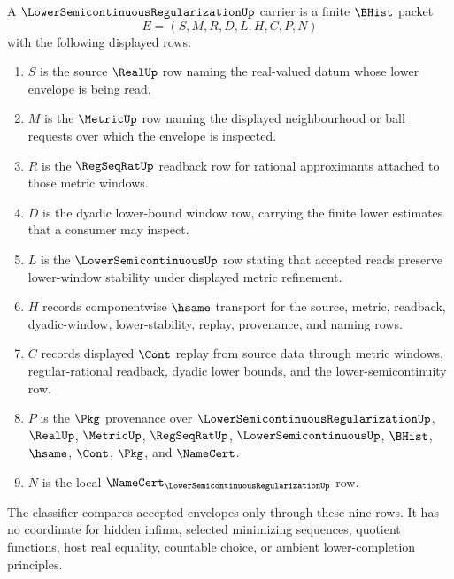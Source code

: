 \begin{definition}
\label{def:semicontinuous-envelope-carrier}
A $\LowerSemicontinuousRegularizationUp$ carrier is a finite $\BHist$ packet
$$
E=(S,M,R,D,L,H,C,P,N)
$$
with the following displayed rows:
\begin{enumerate}
\item $S$ is the source $\RealUp$ row naming the real-valued datum whose lower envelope is being read.
\item $M$ is the $\MetricUp$ row naming the displayed neighbourhood or ball requests over which the envelope is inspected.
\item $R$ is the $\RegSeqRatUp$ readback row for rational approximants attached to those metric windows.
\item $D$ is the dyadic lower-bound window row, carrying the finite lower estimates that a consumer may inspect.
\item $L$ is the $\LowerSemicontinuousUp$ row stating that accepted reads preserve lower-window stability under displayed metric refinement.
\item $H$ records componentwise $\hsame$ transport for the source, metric, readback, dyadic-window, lower-stability, replay, provenance, and naming rows.
\item $C$ records displayed $\Cont$ replay from source data through metric windows, regular-rational readback, dyadic lower bounds, and the lower-semicontinuity row.
\item $P$ is the $\Pkg$ provenance over $\LowerSemicontinuousRegularizationUp$, $\RealUp$, $\MetricUp$, $\RegSeqRatUp$, $\LowerSemicontinuousUp$, $\BHist$, $\hsame$, $\Cont$, $\Pkg$, and $\NameCert$.
\item $N$ is the local $\NameCert_{\LowerSemicontinuousRegularizationUp}$ row.
\end{enumerate}
The classifier compares accepted envelopes only through these nine rows. It has no coordinate for hidden infima, selected minimizing sequences, quotient functions, host real equality, countable choice, or ambient lower-completion principles.
\end{definition}

